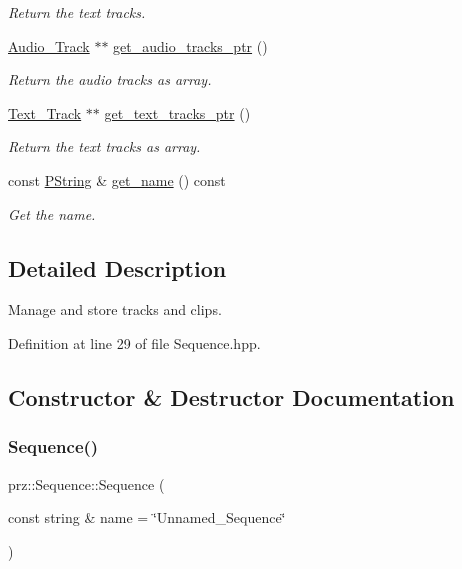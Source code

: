\begin{DoxyCompactItemize}
\begin{DoxyCompactList}\small\item\em Return the text tracks. \end{DoxyCompactList}\item 
\mbox{\hyperlink{classprz_1_1_audio___track}{Audio\+\_\+\+Track}} $\ast$$\ast$ \mbox{\hyperlink{classprz_1_1_sequence_a3e0efc91f696efcc1d57de2045fc4d21}{get\+\_\+audio\+\_\+tracks\+\_\+ptr}} ()
\begin{DoxyCompactList}\small\item\em Return the audio tracks as array. \end{DoxyCompactList}\item 
\mbox{\hyperlink{classprz_1_1_text___track}{Text\+\_\+\+Track}} $\ast$$\ast$ \mbox{\hyperlink{classprz_1_1_sequence_af987ebf568d1a5ab5d589f9a0e7746c9}{get\+\_\+text\+\_\+tracks\+\_\+ptr}} ()
\begin{DoxyCompactList}\small\item\em Return the text tracks as array. \end{DoxyCompactList}\item 
const \mbox{\hyperlink{classprz_1_1_p_string}{P\+String}} \& \mbox{\hyperlink{classprz_1_1_sequence_a3482d0948898b7573df2e0f86d7e3a83}{get\+\_\+name}} () const
\begin{DoxyCompactList}\small\item\em Get the name. \end{DoxyCompactList}\end{DoxyCompactItemize}


\subsection{Detailed Description}
Manage and store tracks and clips. 



Definition at line 29 of file Sequence.\+hpp.



\subsection{Constructor \& Destructor Documentation}
\mbox{\label{classprz_1_1_sequence_aec5dd736362277677b449619211ebe6f}} 
\subsubsection{\texorpdfstring{Sequence()}{Sequence()}}
{\footnotesize\ttfamily prz\+::\+Sequence\+::\+Sequence (\begin{DoxyParamCaption}\item[{const string \&}]{name = {\ttfamily \char`\"{}Unnamed\+\_\+Sequence\char`\"{}} }\end{DoxyParamCaption})}



